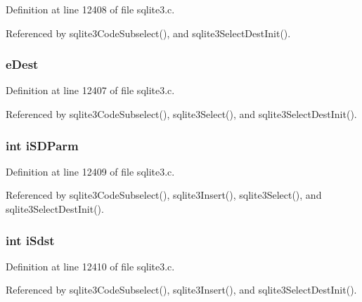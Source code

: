 Definition at line 12408 of file sqlite3.\+c.



Referenced by sqlite3\+Code\+Subselect(), and sqlite3\+Select\+Dest\+Init().

\hypertarget{struct_select_dest_aaa86d55283947db49520122062f74e1e}{}
\subsubsection[{e\+Dest}]{ e\+Dest}\label{struct_select_dest_aaa86d55283947db49520122062f74e1e}


Definition at line 12407 of file sqlite3.\+c.



Referenced by sqlite3\+Code\+Subselect(), sqlite3\+Select(), and sqlite3\+Select\+Dest\+Init().

\hypertarget{struct_select_dest_a3d334c4f8a37baba3876773660d7d876}{}
\subsubsection[{i\+S\+D\+Parm}]{\setlength{\rightskip}{0pt plus 5cm}int i\+S\+D\+Parm}\label{struct_select_dest_a3d334c4f8a37baba3876773660d7d876}


Definition at line 12409 of file sqlite3.\+c.



Referenced by sqlite3\+Code\+Subselect(), sqlite3\+Insert(), sqlite3\+Select(), and sqlite3\+Select\+Dest\+Init().

\hypertarget{struct_select_dest_a0f6bcbdfbe94046ca304a0149d97efc8}{}
\subsubsection[{i\+Sdst}]{\setlength{\rightskip}{0pt plus 5cm}int i\+Sdst}\label{struct_select_dest_a0f6bcbdfbe94046ca304a0149d97efc8}


Definition at line 12410 of file sqlite3.\+c.



Referenced by sqlite3\+Code\+Subselect(), sqlite3\+Insert(), and sqlite3\+Select\+Dest\+Init().

